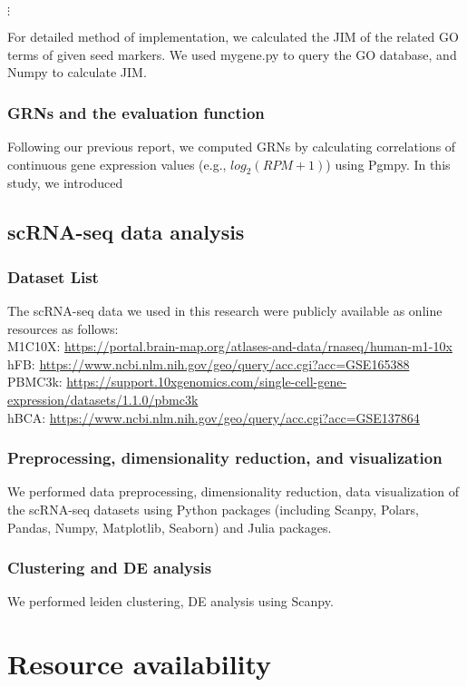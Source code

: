 \documentclass{article}
\begin{document}
$\vdots$

For detailed method of implementation, we calculated the JIM of the related GO terms of given seed markers. We used mygene.py\cite{mygene} to query the GO database, and Numpy\cite{numpy} to calculate JIM.

\subsubsection*{GRNs and the evaluation function}
Following our previous report\cite{okano2023set}, we computed GRNs by calculating
correlations of continuous gene expression values (e.g., $log_2(RPM+1)$) using Pgmpy\cite{pgmpy}. In this study, we introduced

\subsection*{scRNA-seq data analysis}
\subsubsection*{Dataset List}
The scRNA-seq data we used in this research were publicly available as online
resources as follows:\\
M1C10X: \url{https://portal.brain-map.org/atlases-and-data/rnaseq/human-m1-10x}\\
hFB: \url{https://www.ncbi.nlm.nih.gov/geo/query/acc.cgi?acc=GSE165388}\\
PBMC3k: \url{https://support.10xgenomics.com/single-cell-gene-expression/datasets/1.1.0/pbmc3k}\\
hBCA: \url{https://www.ncbi.nlm.nih.gov/geo/query/acc.cgi?acc=GSE137864}\\
\subsubsection*{Preprocessing, dimensionality reduction, and visualization}
We performed data preprocessing, dimensionality reduction, data visualization
of the scRNA-seq datasets using Python packages (including Scanpy\cite{scanpy}, Polars,
Pandas\cite{pandas}, Numpy, Matplotlib\cite{matplotlib}, Seaborn\cite{seaborn}) and Julia packages.
\subsubsection*{Clustering and DE analysis}
We performed leiden clustering, DE analysis using Scanpy.

\section*{Resource availability}
\end{document}
